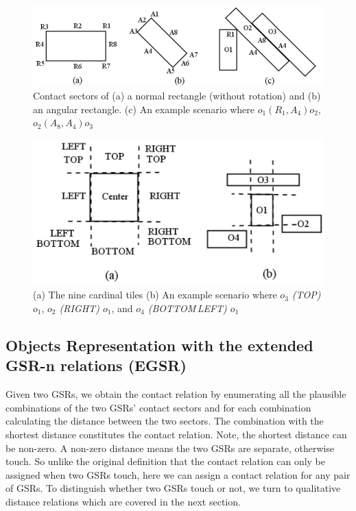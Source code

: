 \documentclass[letterpaper]{article}
\begin{document}
\begin{figure}[t]
\centering\includegraphics[scale=0.28]{GSR.png}
\vspace{-3mm}
\caption{Contact sectors of (a) a normal rectangle (without rotation) and (b) an angular rectangle. (c) An example scenario where $o_1 (R_1, A_4) o_2$, $o_2 (A_8, A_4) o_3$}
\label{GSR}
\vspace{-4mm}
\end{figure}
\begin{figure}[t]
\centering\includegraphics[scale=0.30]{CardinalTiles.png}
\vspace{-4mm}
\caption{(a) The nine cardinal tiles (b) An example scenario where \emph{$o_3$ (TOP) $o_1$}, \emph{$o_2$ (RIGHT) $o_1$}, and \emph{$o_4$ (BOTTOM\,LEFT) $o_1$}}
\label{CardinalTile}
\vspace{-4mm}
\end{figure}



\subsection{Objects Representation with the extended GSR-n relations (EGSR)}


Given two GSRs, we obtain the contact relation by enumerating all the plausible combinations of the two GSRs' contact sectors and for each combination calculating the distance between the two sectors. The combination with the shortest distance constitutes the contact relation. Note, the shortest distance can be non-zero. A non-zero distance means the two GSRs are separate, otherwise touch. So unlike the original definition that the contact relation can only be assigned when two GSRs touch, here we can assign a contact relation for any pair of GSRs. To distinguish whether two GSRs touch or not, we turn to qualitative distance relations which are covered in the next section.
\end{document}
